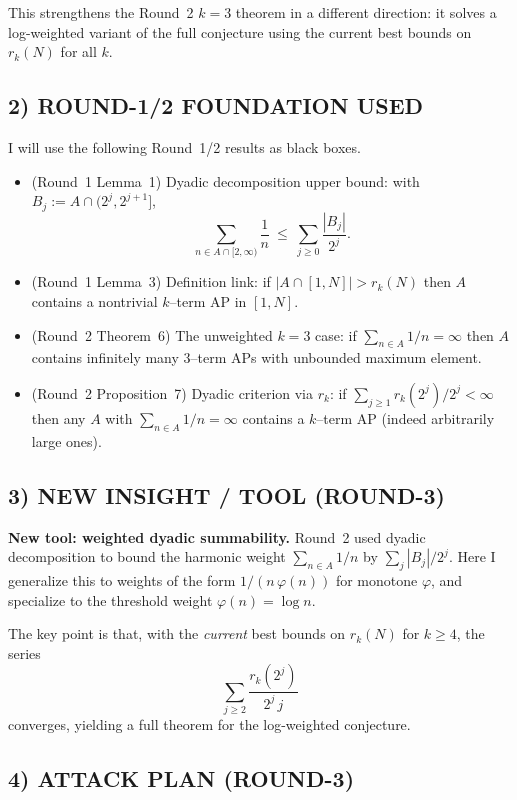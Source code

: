 This strengthens the Round~2 $k=3$ theorem in a different direction: it solves a log-weighted variant of the full conjecture using the current best bounds on $r_k(N)$ for all $k$.

\subsection{2) ROUND-1/2 FOUNDATION USED}

I will use the following Round~1/2 results as black boxes.
\begin{itemize}
\item (Round~1 Lemma~1) Dyadic decomposition upper bound: with $B_j:=A\cap(2^j,2^{j+1}]$,
\[\sum_{n\in A\cap[2,\infty)}\frac1n\ \le\ \sum_{j\ge 0}\frac{|B_j|}{2^j}.\]
\item (Round~1 Lemma~3) Definition link: if $|A\cap[1,N]|>r_k(N)$ then $A$ contains a nontrivial $k$--term AP in $[1,N]$.
\item (Round~2 Theorem~6) The unweighted $k=3$ case: if $\sum_{n\in A}1/n=\infty$ then $A$ contains infinitely many $3$--term APs with unbounded maximum element.
\item (Round~2 Proposition~7) Dyadic criterion via $r_k$: if $\sum_{j\ge 1} r_k(2^j)/2^j<\infty$ then any $A$ with $\sum_{n\in A}1/n=\infty$ contains a $k$--term AP (indeed arbitrarily large ones).
\end{itemize}

\subsection{3) NEW INSIGHT / TOOL (ROUND-3)}

\textbf{New tool: weighted dyadic summability.}
Round~2 used dyadic decomposition to bound the harmonic weight $\sum_{n\in A}1/n$ by $\sum_j |B_j|/2^j$. Here I generalize this to weights of the form $1/(n\,\varphi(n))$ for monotone $\varphi$, and specialize to the threshold weight $\varphi(n)=\log n$.

The key point is that, with the \emph{current} best bounds on $r_k(N)$ for $k\ge 4$, the series
\[\sum_{j\ge 2}\frac{r_k(2^j)}{2^j\,j}\]
converges, yielding a full theorem for the log-weighted conjecture.

\subsection{4) ATTACK PLAN (ROUND-3)}

